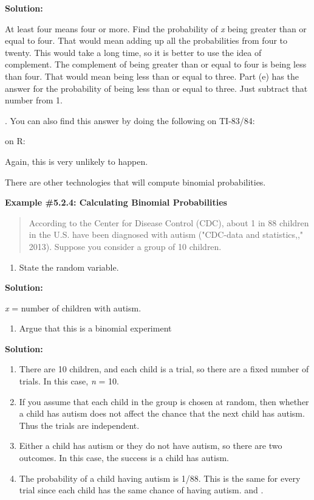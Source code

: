 \documentclass[]{book}
\providecommand{\tightlist}{%
  \setlength{\itemsep}{0pt}\setlength{\parskip}{0pt}}
\begin{document}
\textbf{Solution:}

At least four means four or more. Find the probability of \emph{x} being
greater than or equal to four. That would mean adding up all the
probabilities from four to twenty. This would take a long time, so it is
better to use the idea of complement. The complement of being greater
than or equal to four is being less than four. That would mean being
less than or equal to three. Part (e) has the answer for the probability
of being less than or equal to three. Just subtract that number from 1.

. You can also find this answer by doing the following on TI-83/84:

on R:

Again, this is very unlikely to happen.

There are other technologies that will compute binomial probabilities.

\textbf{Example \#5.2.4: Calculating Binomial Probabilities}

\begin{quote}
According to the Center for Disease Control (CDC), about 1 in 88
children in the U.S. have been diagnosed with autism ("CDC-data and
statistics,," 2013). Suppose you consider a group of 10 children.
\end{quote}

\begin{enumerate}
\def\labelenumi{\alph{enumi}.}
\tightlist
\item
  State the random variable.
\end{enumerate}

\textbf{Solution:}

\emph{x} = number of children with autism.

\begin{enumerate}
\def\labelenumi{\alph{enumi}.}
\setcounter{enumi}{1}
\tightlist
\item
  Argue that this is a binomial experiment
\end{enumerate}

\textbf{Solution:}

\begin{enumerate}
\def\labelenumi{\arabic{enumi}.}
\item
  There are 10 children, and each child is a trial, so there are a
  fixed number of trials. In this case, \emph{n} = 10.
\item
  If you assume that each child in the group is chosen at random, then
  whether a child has autism does not affect the chance that the next
  child has autism. Thus the trials are independent.
\item
  Either a child has autism or they do not have autism, so there are
  two outcomes. In this case, the success is a child has autism.
\item
  The probability of a child having autism is 1/88. This is the same
  for every trial since each child has the same chance of having
  autism. and .
\end{enumerate}
\end{document}
